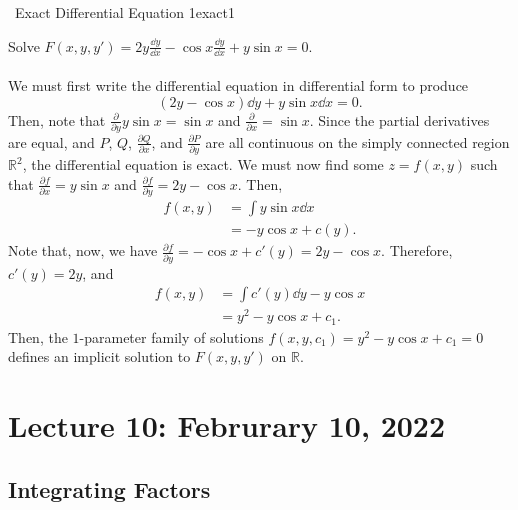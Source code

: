         \begin{example}{\Difficulty\,\Difficulty\,\,Exact Differential Equation 1}{exact1}

            Solve \(F(x,y,y')=2y\frac{\dd y}{\dd x}-\cos x\frac{\dd y}{\dd x}+y\sin x=0\).
            \\
            \\
            We must first write the differential equation in differential form to produce
            \begin{equation*}
                (2y-\cos x)\dd y+y\sin x\dd x=0.
            \end{equation*}
            Then, note that \(\frac{\partial}{\partial y}y\sin x=\sin x\) and \(\frac{\partial}{\partial x}=\sin x\). Since the partial derivatives are equal, and \(P\), \(Q\), \(\frac{\partial Q}{\partial x}\), and \(\frac{\partial P}{\partial y}\) are all continuous on the simply connected region \(\mathbb{R}^2\), the differential equation is exact. We must now find some \(z=f(x,y)\) such that \(\frac{\partial f}{\partial x}=y\sin x\) and \(\frac{\partial f}{\partial y}=2y-\cos x\). Then,
            \begin{align*}
                f(x,y)&=\int y\sin x\dd x \\
                &=-y\cos x+c(y).
            \end{align*}
            Note that, now, we have \(\frac{\partial f}{\partial y}=-\cos x+c'(y)=2y-\cos x\). Therefore, \(c'(y)=2y\), and
            \begin{align*}
                f(x,y)&=\int c'(y)\dd y-y\cos x \\
                &=y^2-y\cos x+c_1.
            \end{align*}
            Then, the \(1\)-parameter family of solutions \(f(x,y,c_1)=y^2-y\cos x+c_1=0\) defines an implicit solution to \(F(x,y,y')\) on \(\mathbb{R}\).
        \end{example}

\pagebreak

\section{Lecture 10: Februrary 10, 2022}

    \subsection{Integrating Factors}

